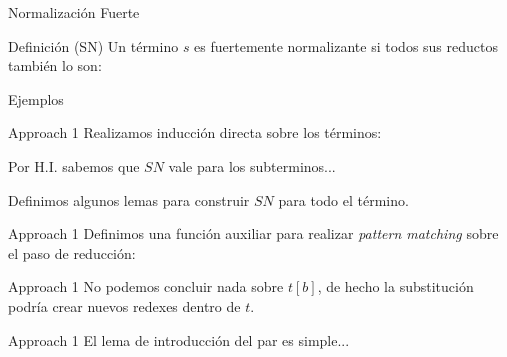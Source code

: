 
\begin{frame}{Normalización Fuerte}
	\begin{block}{Definición (SN)}
		Un término $s$ es fuertemente normalizante si todos sus reductos también lo son:

		\centering
		\begin{prooftree}
		\end{prooftree}
	\end{block}
	
	\pause
	
	
\end{frame}

\begin{frame}{Ejemplos}
	\pause
	\pause
\end{frame}

\begin{frame}{Approach 1}
	Realizamos inducción directa sobre los términos:
	\begin{AgdaSuppressSpace}
		
		\pause
		
	\end{AgdaSuppressSpace}
	
	Por H.I. sabemos que $SN$ vale para los subterminos...
	\pause
	
	Definimos algunos lemas para construir $SN$ para todo el término.
\end{frame}

\begin{frame}{Approach 1}
	Definimos una función auxiliar para realizar \textit{pattern matching} sobre el paso de reducción:
	
\end{frame}

\begin{frame}{Approach 1}
	\pause
	No podemos concluir nada sobre $t[b]$, de hecho la substitución podría crear nuevos redexes dentro de $t$.
\end{frame}

\begin{frame}{Approach 1}
	El lema de introducción del par es simple...
\end{frame}

